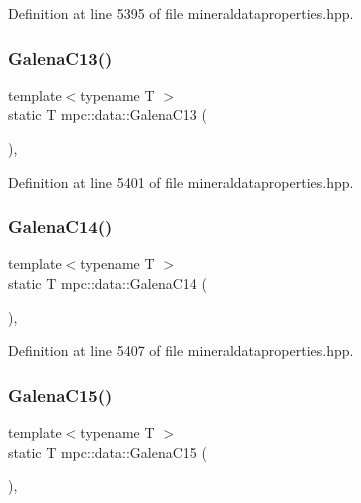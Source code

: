 Definition at line 5395 of file mineraldataproperties.\+hpp.

\mbox{\label{namespacempc_1_1data_abd5682aafcd14bdc5a5e1d3989db8322}} 
\subsubsection{\texorpdfstring{Galena\+C13()}{GalenaC13()}}
{\footnotesize\ttfamily template$<$typename T $>$ \\
static T mpc\+::data\+::\+Galena\+C13 (\begin{DoxyParamCaption}{ }\end{DoxyParamCaption})\hspace{0.3cm}{\ttfamily [inline]}, {\ttfamily [static]}}



Definition at line 5401 of file mineraldataproperties.\+hpp.

\mbox{\label{namespacempc_1_1data_a60b4bdc4c79c3860a50d4863e470d084}} 
\subsubsection{\texorpdfstring{Galena\+C14()}{GalenaC14()}}
{\footnotesize\ttfamily template$<$typename T $>$ \\
static T mpc\+::data\+::\+Galena\+C14 (\begin{DoxyParamCaption}{ }\end{DoxyParamCaption})\hspace{0.3cm}{\ttfamily [inline]}, {\ttfamily [static]}}



Definition at line 5407 of file mineraldataproperties.\+hpp.

\mbox{\label{namespacempc_1_1data_a40d6ba73b02fbdd4bec07b3326f6ebfd}} 
\subsubsection{\texorpdfstring{Galena\+C15()}{GalenaC15()}}
{\footnotesize\ttfamily template$<$typename T $>$ \\
static T mpc\+::data\+::\+Galena\+C15 (\begin{DoxyParamCaption}{ }\end{DoxyParamCaption})\hspace{0.3cm}{\ttfamily [inline]}, {\ttfamily [static]}}



